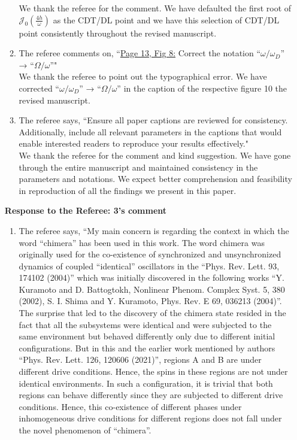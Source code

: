 \documentclass[aps,prb,reprint,showpacs,floatfix,superscriptaddress, onecolumn, nofootinbib, 10pt]{revtex4-2}
\newcommand{\response}[1]{{\color{black}#1}} %
\newcommand{\comment}[1]{{\color{blue}#1}} %
\begin{document}
\begin{enumerate}
\begin{enumerate}
		\response{We thank the referee for the comment. We have defaulted the first root of $\mathcal{J}_0\left(\frac{4h}{\omega}\right)$ as the CDT/DL point and we have this selection of CDT/DL point consistently throughout the revised manuscript.}\\
		
		\item The referee comments on, \comment{``\underline{Page 13, Fig 8:} Correct the notation “$\omega/\omega_D$” → “$\Omega/\omega$”"}\\
		
		\response{We thank the referee to point out the typographical error. We have corrected “$\omega/\omega_D$” → “$\Omega/\omega$” in the caption of the respective figure 10 the revised manuscript.}\\
		\item The referee says, \comment{``Ensure all paper captions are reviewed for consistency. Additionally, include all relevant
			parameters in the captions that would enable interested readers to reproduce your
			results effectively."}\\
		
		\response{We thank the referee for the comment and kind suggestion. We have gone through the entire manuscript and maintained consistency in the parameters and notations. We expect  better comprehension and feasibility in reproduction of all the findings we present in this paper.}
	\end{enumerate}


	\newpage
	\noindent \textbf{Response to the Referee: 3's comment}
	\begin{enumerate}
		\item The referee says, \comment{``My main concern is regarding the context in which the word “chimera” has been used
			in this work. The word chimera was originally used for the co-existence of synchronized and unsynchronized dynamics of coupled “identical” oscillators in the “Phys. Rev. Lett. 93, 174102 (2004)” which was initially discovered in the following
			works “Y. Kuramoto and D. Battogtokh, Nonlinear Phenom. Complex Syst. 5, 380 (2002), S. I. Shima and Y. Kuramoto, Phys. Rev. E 69, 036213 (2004)”. The surprise that led to the discovery of the chimera state resided in the fact that all the
			subsystems were identical and were subjected to the same environment but behaved differently only due to different initial configurations. But in this and the earlier work mentioned by authors “Phys. Rev. Lett. 126, 120606 (2021)”, regions A and B are under different drive conditions. Hence, the spins in these regions are not under identical environments. In such a configuration, it is trivial that both regions can behave differently since they are subjected to different drive conditions. Hence, this co-existence of different phases under inhomogeneous drive conditions for different
			regions does not fall under the novel phenomenon of “chimera”.\\
			
}
\end{enumerate}
\end{enumerate}
\end{document}
